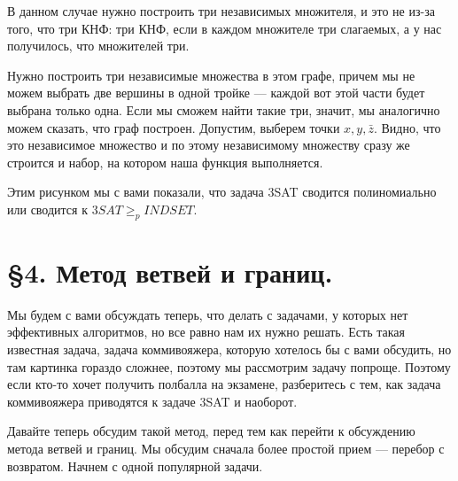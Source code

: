 \documentclass[russian]{lecture-notes}
\theoremstyle{definition}
\begin{document}
		В данном случае нужно построить три независимых множителя, и это не из-за того, что три КНФ: три КНФ, если в каждом множителе три слагаемых, а у нас получилось, что множителей три. 
		
		Нужно построить три независимые множества в этом графе, причем мы не можем выбрать две вершины в одной тройке --- каждой вот этой части будет выбрана только одна.
		Если мы сможем найти такие три, значит, мы аналогично можем сказать, что граф построен. Допустим, выберем точки $x, y, \bar{z}$. Видно, что это независимое множество и по этому независимому множеству сразу же строится и набор, на котором наша функция выполняется.
		
		Этим рисунком мы с вами показали, что задача 3SAT сводится полиномиально или сводится к $3SAT \geq _p INDSET$. 
		
	\section*{\S4. Метод ветвей и границ.}
	
	Мы будем с вами обсуждать теперь, что делать с задачами, у которых нет эффективных алгоритмов, но все равно нам их нужно решать. Есть такая известная задача, задача коммивояжера,
	которую хотелось бы с вами обсудить, но там картинка гораздо сложнее, поэтому мы рассмотрим задачу попроще. Поэтому если кто-то хочет получить полбалла на экзамене, разберитесь с тем, как задача коммивояжера приводятся к задаче 3SAT и наоборот.
		
	Давайте теперь обсудим такой метод, перед тем как перейти к обсуждению метода ветвей и границ.
	Мы обсудим сначала более простой прием --- перебор с возвратом. Начнем с одной популярной задачи.
	
\end{document}
